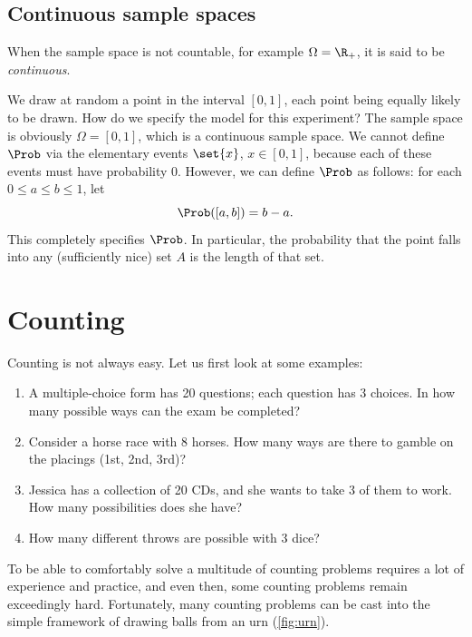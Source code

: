 \subsection{Continuous sample spaces}\label{sec:continuous-sample-spaces}

When the sample space is not countable, for example $\Omega = \R_+$, it is said to be \emph{continuous}.

\begin{example}\label{ex:point-in-interval}
We draw at random a point in the interval $[0, 1]$, each point being equally likely to be drawn. How do we specify the model for this experiment? The sample space is obviously $\Omega = [0, 1]$, which is a continuous sample space. We cannot define $\Prob$ via the elementary events $\set{x}$, $x \in [0, 1]$, because each of these events must have probability 0. However, we can define $\Prob$ as follows: for each $0 \le a \le b \le 1$, let
\[
  \Prob([a, b]) = b - a.
\]
This completely specifies $\Prob$. In particular, the probability that the point falls into any (sufficiently nice) set $A$ is the length of that set.
\end{example}

\section{Counting}\label{sec:counting}

Counting is not always easy. Let us first look at some examples:
\begin{enumerate}
  \item A multiple-choice form has 20 questions; each question has 3 choices. In how many possible ways can the exam be completed?
  \item Consider a horse race with 8 horses. How many ways are there to gamble on the placings (1st, 2nd, 3rd)?
  \item Jessica has a collection of 20 CDs, and she wants to take 3 of them to work. How many possibilities does she have?
  \item How many different throws are possible with 3 dice?
\end{enumerate}
To be able to comfortably solve a multitude of counting problems requires a lot of experience and practice, and even then, some counting problems remain exceedingly hard. Fortunately, many counting problems can be cast into the simple framework of drawing balls from an urn (\cref{fig:urn}).

